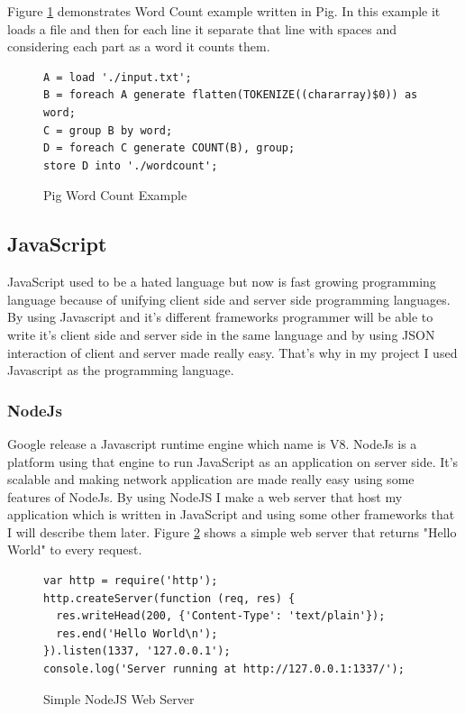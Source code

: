 \documentclass[a4paper,11pt]{report}
\begin{document}
Figure \ref{fig:hiveqlpig}  demonstrates Word Count example written in Pig. In this example it loads a file and then for each line it separate that line with spaces and considering each part as a word it counts them.

\begin{figure}[!hbp]
\caption{Pig Word Count Example}
\begin{lstlisting}
A = load './input.txt';
B = foreach A generate flatten(TOKENIZE((chararray)$0)) as word;
C = group B by word;
D = foreach C generate COUNT(B), group;
store D into './wordcount';
\end{lstlisting}
\label{fig:hiveqlpig}
\end{figure}

\subsection{JavaScript}
JavaScript used to be a hated language but now is fast growing programming language because of unifying client side and server side programming languages. By using Javascript and it's different frameworks programmer will be able to write it's client side and server side in the same language and by using JSON interaction of client and server made really easy. That's why in my project I used Javascript as the programming language.
\subsubsection{NodeJs}
Google release a Javascript runtime engine which name is V8. NodeJs is a platform using that engine to run JavaScript as an application on server side. It's scalable and making network application are made really easy using some features of NodeJs. By using NodeJS I make a web server that host my application which is written in JavaScript and using some other frameworks that I will describe them later. Figure \ref{fig:nodejsserver} shows a simple web server that returns "Hello World" to every request.

\begin{figure}[!hbp]
\caption{Simple NodeJS Web Server}
\begin{lstlisting}
var http = require('http');
http.createServer(function (req, res) {
  res.writeHead(200, {'Content-Type': 'text/plain'});
  res.end('Hello World\n');
}).listen(1337, '127.0.0.1');
console.log('Server running at http://127.0.0.1:1337/');
\end{lstlisting}
\label{fig:nodejsserver}
\end{figure}
\end{document}
